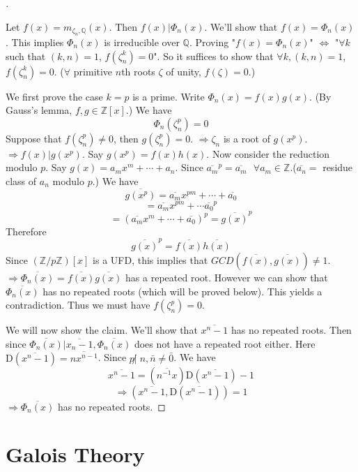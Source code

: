 \documentclass{article}
\newcommand{\sfa}{\text{  } \forall}
\theoremstyle{definition}
\newenvironment{proofs}[1][\proofname]{%
  \begin{proof}[#1]$ $\par\nobreak\ignorespaces
}{%
  \end{proof}
}
\begin{document}
\begin{proofs}
	Let $f(x) = m_{\zeta_n, \mathbb{Q}}(x)$.
	Then $f(x) | \Phi_n(x)$.
	We'll show that $f(x) = \Phi_n(x)$.
	This implies $\Phi_n(x)$ is irreducible over $\mathbb{Q}$.
	Proving "$f(x) = \Phi_n(x)$" $\Leftrightarrow$ "$\forall k$ such that $(k, n) = 1$, $f(\zeta_n^k) = 0$".
	So it suffices to show that $\forall k, (k, n) = 1$, $f(\zeta_n^k) = 0$. ($\forall $ primitive $n$th roots $\zeta$ of unity, $f(\zeta) = 0$.)
	\par We first prove the case $k = p$ is a prime.
	Write $\Phi_n(x) = f(x) g(x)$. (By Gauss's lemma, $f, g \in \mathbb{Z}[x]$.)
	We have
	\[
		\Phi_n(\zeta_n^p) = 0
	\]
	Suppose that $f(\zeta_n^p) \neq 0$, then $g(\zeta_n^p) = 0$.
	$\Rightarrow \zeta_n$ is a root of $g(x^p)$.
	$\Rightarrow f(x) | g(x^p)$.
	Say $g(x^p) = f(x) h(x)$.
	Now consider the reduction modulo $p$.
	Say $g(x) = a_m x^m + \cdots + a_n$.
	Since $\overline{a_m}^p = \overline{a_m} \sfa a_m \in \mathbb{Z}$.($\overline{a_n} = $ residue class of $a_n$ modulo $p$.)
	We have
	\[
		\overline{g(x^p)} = \overline{a_m} x^{pm} + \cdots + \overline{a_0}
	\]
	\[
		= \overline{a_m} x^{pm} + \cdots \overline{a_0}^p
	\]
	\[
		= (\overline{a_m} x^m + \cdots + \overline{a_0})^p = \overline{g(x)}^p
	\]
	Therefore
	\[
		\overline{g(x)}^p = \overline{f(x)}\overline{h(x)}
	\]
	Since $(\mathbb{Z}/p \mathbb{Z})[x]$ is a UFD, this implies that $GCD(\overline{f(x)}, \overline{g(x)}) \neq 1$.
	$\Rightarrow \overline{\Phi_n(x)} = \overline{f(x)} \overline{g(x)}$ has a repeated root.
	However we can show that $\overline{\Phi_n(x)}$ has no repeated roots (which will be proved below).
	This yields a contradiction.
	Thus we must have $f(\zeta_n^p) = 0$.
	\par We will now show the claim.
	We'll show that $\overline{x^n - 1}$ has no repeated roots.
	Then since $\overline{\Phi_n(x)} | \overline{x_n - 1}, \overline{\Phi_n(x)}$ does not have a repeated root either.
	Here $\mathrm{D}(\overline{x^n - 1}) = \overline{n x^{n - 1}}$.
	Since $p \not| \; n, \bar{n} \neq \bar{0}$.
	We have
	\[
		\overline{x^n - 1} = (\overline{n^{-1}x}) \mathrm{D}(\overline{x^n - 1}) - 1
	\]
	\[
		\Rightarrow (\overline{x^n - 1}, \mathrm{D}(\overline{x^n - 1})) = 1
	\]
	$\Rightarrow \overline{\Phi_n(x)}$ has no repeated roots.
\end{proofs}

\clearpage
\section{Galois Theory}
\end{document}
